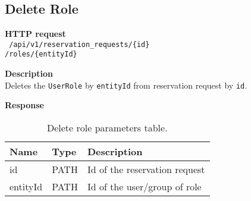 \subsection{Delete Role}
\begin{description}
    \item \textbf{HTTP request}\\
        \texttt{\text{[DELETE]} /api/v1/reservation\_requests/\{id\} \\
        /roles/\{entityId\}}
    \item \textbf{Description}\\
        Deletes the \texttt{UserRole} by \texttt{entityId} from reservation request by \texttt{id}.
    \item \textbf{Response}\\
        \texttt{\text{[200 OK]}}
\end{description}
\begin{table}[ht!]
    \begin{tabularx}{\textwidth}{llX}
        \toprule
        Name & Type & Description \\
        \midrule
        id & PATH & Id of the reservation request \\
        entityId & PATH & Id of the user/group of role \\
        \end{tabularx}
    \caption{Delete role parameters table.}
\end{table}
